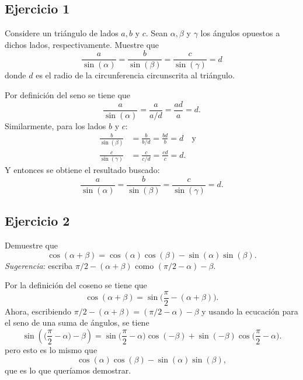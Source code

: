 
\pgfplotsset{compat=1.15}

\usepackage{mathrsfs}

\usetikzlibrary{arrows}

		\subsection*{Ejercicio 1}
		Considere un triángulo de lados $a, b$ y $c$. Sean $\alpha,\beta$ y $\gamma$ los ángulos
		opuestos a dichos lados, respectivamente. Muestre que
		\[ \frac{a}{\sin(\alpha)} = \frac{b}{\sin(\beta)} = \frac{c}{\sin(\gamma)} = d \]
		donde $d$ es el radio de la circunferencia circunscrita al triángulo.
		\begin{sol}
			Por definición del seno se tiene que
			\[ \frac{a}{\sin(\alpha)} = \frac{a}{a/d} = \frac{ad}{a} = d. \]
			Similarmente, para los lados $b$ y $c$:
			\begin{align*}
				\frac{b}{\sin(\beta)} &= \frac{b}{b/d} = \frac{bd}{b} = d\quad\text{y}\quad\\[.2em]
				\frac{c}{\sin(\gamma)} &= \frac{c}{c/d} = \frac{cd}{c} = d.
			\end{align*}
			Y entonces se obtiene el resultado buscado:
			\[ \frac{a}{\sin(\alpha)} = \frac{b}{\sin(\beta)} = \frac{c}{\sin(\gamma)} = d. \]
		\end{sol}
	\subsection*{Ejercicio 2}
	Demuestre que 
	\[ \cos(\alpha+\beta) = \cos(\alpha)\cos(\beta) - \sin(\alpha)\sin(\beta). \]
	\emph{Sugerencia}: escriba $\pi/2-(\alpha+\beta)$ como $(\pi/2-\alpha) - \beta$.
	\begin{sol}
		Por la definición del coseno se tiene que
		\[ \cos(\alpha+\beta) = \sin\big(\frac{\pi}{2} - (\alpha+\beta)\big). \]
		Ahora, escribiendo $\pi/2 - (\alpha+\beta) = (\pi/2 - \alpha) - \beta$ y usando la ecucación para el seno de una suma de ángulos, se tiene
		\[ \sin( \big(\frac{\pi}{2} - \alpha\big) - \beta ) = \sin\big(\frac{\pi}{2} - \alpha\big)\cos(-\beta) + \sin(-\beta)\cos\big(\frac{\pi}{2} - \alpha\big). \]
		pero esto es lo mismo que
		\[ \cos(\alpha)\cos(\beta) - \sin(\alpha)\sin(\beta), \]
		que es lo que queríamos demostrar.
	\end{sol}
